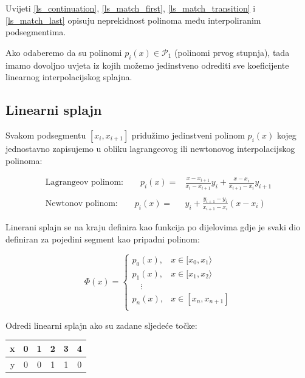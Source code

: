 Uvijeti \ref{ls_continuation}, \ref{ls_match_first}, \ref{ls_match_transition} i \ref{ls_match_last} opisuju neprekidnost polinoma među interpoliranim podsegmentima.

Ako odaberemo da su polinomi $p_i(x)\in\mathcal{P}_1$ (polinomi prvog stupnja), tada imamo dovoljno uvjeta iz kojih možemo jedinstveno odrediti sve koeficijente linearnog interpolacijskog splajna.

\subsection{Linearni splajn}

Svakom podsegmentu $[x_i,x_{i+1}]$ pridužimo jedinstveni polinom $p_i(x)$ kojeg jednostavno zapisujemo u obliku lagrangeovog ili newtonovog interpolacijskog polinoma:

\begin{align*}
\text{Lagrangeov polinom:}\qquad p_i(x) =& \frac{x-x_{i+1}}{x_i-x_{i+1}}y_i + \frac{x-x_i}{x_{i+1}-x_i}y_{i+1}\\\\
\text{Newtonov polinom:}\qquad p_i(x) =& y_i + \frac{y_{i+1}-y_i}{x_{i+1}-x_i}(x-x_i)
\end{align*}

Linerani splajn se na kraju definira kao funkcija po dijelovima gdje je svaki dio definiran za pojedini segment kao pripadni polinom:

\begin{equation}
    \Phi(x)=\begin{cases}
        p_0(x),&x\in[x_0,x_1\rangle\\
        p_1(x),&x\in[x_1,x_2\rangle\\
        \quad\vdots&\\
        p_n(x),&x\in[x_n,x_{n+1}]\\
    \end{cases}
\end{equation}

\newpage

\begin{example}
    Odredi linearni splajn ako su zadane sljedeće točke:

    \center
    \begin{tabular}{r|c|c|c|c|c}
        x&0&1&2&3&4\\
        \hline
        y&0&0&1&1&0
    \end{tabular}
\end{example}

